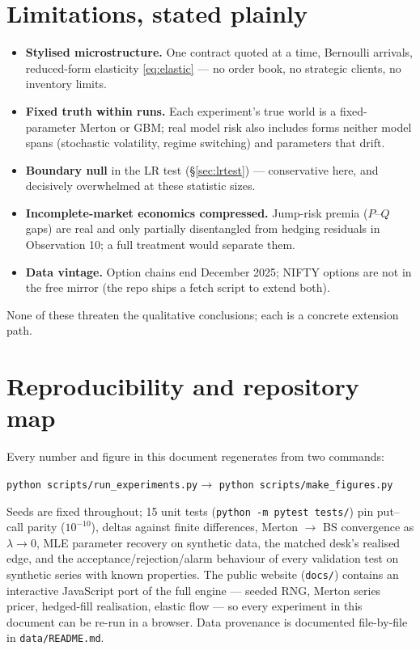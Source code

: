 \documentclass[11pt,a4paper]{article}
\begin{document}
\section{Limitations, stated plainly}
\label{sec:limitations}
\begin{itemize}[itemsep=2pt]
\item \textbf{Stylised microstructure.} One contract quoted at a time,
  Bernoulli arrivals, reduced-form elasticity \eqref{eq:elastic} --- no order
  book, no strategic clients, no inventory limits.
\item \textbf{Fixed truth within runs.} Each experiment's true world is a
  fixed-parameter Merton or GBM; real model risk also includes forms neither
  model spans (stochastic volatility, regime switching) and parameters that
  drift.
\item \textbf{Boundary null} in the LR test (\S\ref{sec:lrtest}) ---
  conservative here, and decisively overwhelmed at these statistic sizes.
\item \textbf{Incomplete-market economics compressed.} Jump-risk premia
  ($P$--$Q$ gaps) are real and only partially disentangled from hedging
  residuals in Observation 10; a full treatment would separate them.
\item \textbf{Data vintage.} Option chains end December 2025; NIFTY options
  are not in the free mirror (the repo ships a fetch script to extend both).
\end{itemize}
None of these threaten the qualitative conclusions; each is a concrete
extension path.

\section{Reproducibility and repository map}
\label{sec:repro}
Every number and figure in this document regenerates from two commands:
\begin{center}
\texttt{python scripts/run\_experiments.py}\quad$\rightarrow$\quad
\texttt{python scripts/make\_figures.py}
\end{center}
Seeds are fixed throughout; 15 unit tests (\texttt{python -m pytest tests/})
pin put--call parity ($10^{-10}$), deltas against finite differences, Merton
$\to$ BS convergence as $\lambda\to0$, MLE parameter recovery on synthetic
data, the matched desk's realised edge, and the acceptance/rejection/alarm
behaviour of every validation test on synthetic series with known properties.
The public website (\texttt{docs/}) contains an interactive JavaScript port of
the full engine --- seeded RNG, Merton series pricer, hedged-fill realisation,
elastic flow --- so every experiment in this document can be re-run in a
browser. Data provenance is documented file-by-file in
\texttt{data/README.md}.
\end{document}
